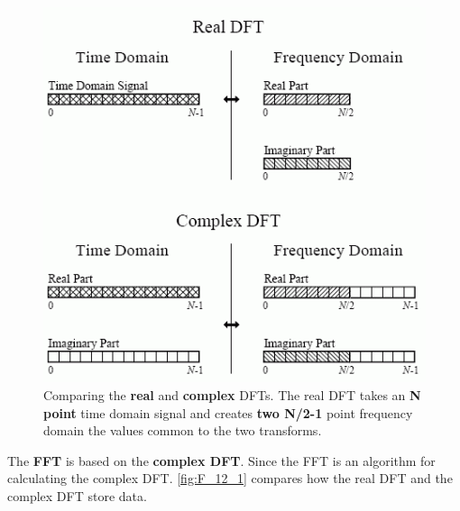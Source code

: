\documentclass[a4paper,12pt]{article}
\begin{document}
\begin{figure}
  \label{fig:F_12_1}
  \centering
	\includegraphics[width=\textwidth, keepaspectratio=true]{F_12_1}
\caption{Comparing the \textbf{real} and \textbf{complex} DFTs.
The real DFT takes an \textbf{N point} time domain signal and creates \textbf{two N/2-1} point frequency domain %
the values common to the two transforms.}
\end{figure}


The \textbf{FFT} is based on the \textbf{complex DFT}.
Since the FFT is an algorithm for calculating the complex DFT. \autoref{fig:F_12_1} compares how the real DFT and the complex DFT store data.\\
\end{document}
